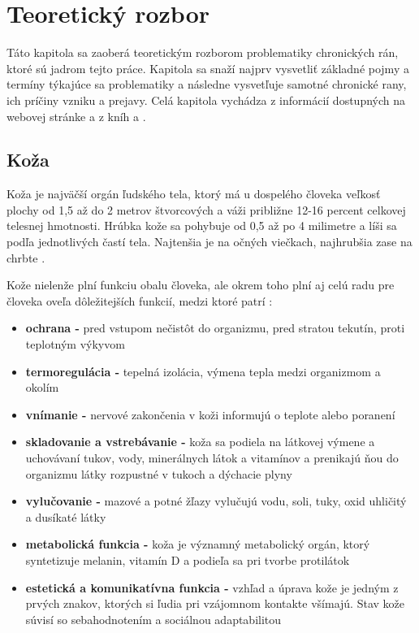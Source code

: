 \chapter{Teoretický rozbor}
\label{chap:teoreticky-rozbor}
Táto kapitola sa zaoberá teoretickým rozborom problematiky chronických rán, ktoré sú jadrom tejto práce. Kapitola sa snaží najprv vysvetliť základné pojmy a termíny týkajúce sa problematiky a následne vysvetľuje samotné chronické rany, ich príčiny vzniku a prejavy. Celá kapitola vychádza z informácií dostupných na webovej stránke \cite{pcCdSrbbhhlr5YcQ} a z kníh \cite{Hlinkova2015} a \cite{Pokorna2012}.  

\section{Koža}
Koža je najväčší orgán ľudského tela\cite{pcCdSrbbhhlr5YcQ}, ktorý má u dospelého človeka veľkosť plochy od 1,5 až do 2 metrov štvorcových\cite{Pokorna2012} a váži približne 12-16 percent celkovej telesnej hmotnosti\cite{Pokorna2012}. Hrúbka kože sa pohybuje od 0,5 až po 4 milimetre a líši sa podľa jednotlivých častí tela\cite{Hlinkova2015}. Najtenšia je na očných viečkach, najhrubšia zase na chrbte \cite{pcCdSrbbhhlr5YcQ}.

Kože nielenže plní funkciu obalu človeka, ale okrem toho plní aj celú radu pre človeka oveľa dôležitejších funkcií, medzi ktoré patrí \cite{Pokorna2012}:
\begin{itemize}  
\item \textbf{ochrana -} pred vstupom nečistôt do organizmu, pred stratou tekutín, proti teplotným výkyvom
\item \textbf{termoregulácia -} tepelná izolácia, výmena tepla medzi organizmom a okolím
\item \textbf{vnímanie -} nervové zakončenia v koži informujú o teplote alebo poranení
\item \textbf{skladovanie a vstrebávanie -} koža sa podiela na látkovej výmene a uchovávaní tukov, vody, minerálnych látok a vitamínov a prenikajú ňou do organizmu látky rozpustné v tukoch a dýchacie plyny
\item \textbf{vylučovanie -} mazové a potné žľazy vylučujú vodu, soli, tuky, oxid uhličitý a dusíkaté látky
\item \textbf{metabolická funkcia -} koža je významný metabolický orgán, ktorý syntetizuje melanin, vitamín D a podieľa sa pri tvorbe protilátok
\item \textbf{estetická a komunikatívna funkcia -} vzhľad a úprava kože je jedným z prvých znakov, ktorých si ľudia pri vzájomnom kontakte všímajú. Stav kože súvisí so sebahodnotením a sociálnou adaptabilitou
\end{itemize}


